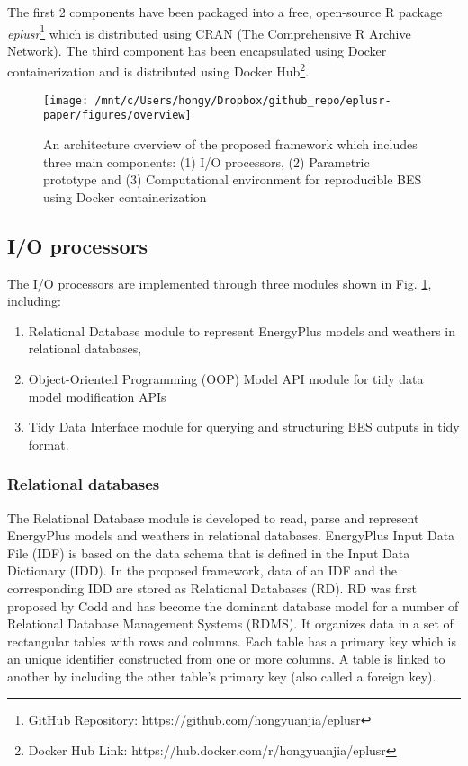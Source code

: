 \documentclass[3p, times]{elsarticle} %
\providecommand{\tightlist}{%
  \setlength{\itemsep}{0pt}\setlength{\parskip}{0pt}}
\begin{document}
The first 2 components have been packaged into a free, open-source R package
\emph{eplusr}\footnote{GitHub Repository: https://github.com/hongyuanjia/eplusr} which is
distributed using CRAN (The Comprehensive R Archive Network).
The third component has been encapsulated using Docker containerization and is
distributed using Docker Hub\footnote{Docker Hub Link: https://hub.docker.com/r/hongyuanjia/eplusr}.

\begin{figure}[!htb]
\texttt{[image: /mnt/c/Users/hongy/Dropbox/github\_repo/eplusr-paper/figures/overview]} \caption{An architecture overview of the proposed framework which includes three main components: (1) I/O processors, (2) Parametric prototype and (3) Computational environment for reproducible BES using Docker containerization}\label{fig:architecture}
\end{figure}

\hypertarget{sec:eplusr-io}{%
\subsection{I/O processors}\label{sec:eplusr-io}}

The I/O processors are implemented through three modules shown in Fig.
\ref{fig:architecture}, including:

\begin{enumerate}
\def\labelenumi{\arabic{enumi}.}
\tightlist
\item
  Relational Database module to represent EnergyPlus models and weathers in relational databases,
\item
  Object-Oriented Programming (OOP) Model API module for tidy data model modification APIs
\item
  Tidy Data Interface module for querying and structuring BES outputs in tidy format.
\end{enumerate}

\hypertarget{relational-databases}{%
\subsubsection{Relational databases}\label{relational-databases}}

The Relational Database module is developed to read, parse and represent
EnergyPlus models and weathers in relational databases.
EnergyPlus Input Data File (IDF) is based on the data schema that is defined in
the Input Data Dictionary (IDD).
In the proposed framework, data of an IDF and the corresponding IDD are stored
as Relational Databases (RD).
RD was first proposed by Codd \citep{Codd1990} and has become the dominant database
model for a number of Relational Database Management Systems (RDMS).
It organizes data in a set of rectangular tables with rows and columns.
Each table has a primary key which is an unique identifier constructed
from one or more columns. A table is linked to another by including the
other table's primary key (also called a foreign key).
\end{document}
